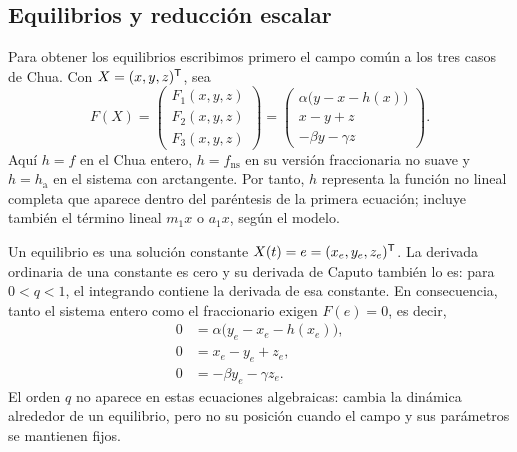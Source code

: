 \fi
\ifnum{}\relax
\subsection{Equilibrios y reducción escalar}
\label{app:equilibrios}

Para obtener los equilibrios escribimos primero el campo común a los tres
casos de Chua. Con \(X=(x,y,z)^{\mathsf T}\), sea
\[
F(X)=
\begin{pmatrix}
F_1(x,y,z)\\ F_2(x,y,z)\\ F_3(x,y,z)
\end{pmatrix}
=
\begin{pmatrix}
\alpha\bigl(y-x-h(x)\bigr)\\
x-y+z\\
-\beta y-\gamma z
\end{pmatrix}.
\]
Aquí \(h=f\) en el Chua entero, \(h=f_{\mathrm{ns}}\) en su versión
fraccionaria no suave y \(h=h_{\mathrm a}\) en el sistema con arctangente.
Por tanto, \(h\) representa la función no lineal completa que aparece dentro
del paréntesis de la primera ecuación; incluye también el término lineal
\(m_1x\) o \(a_1x\), según el modelo.

Un equilibrio es una solución constante \(X(t)=e=(x_e,y_e,z_e)^{\mathsf T}\).
La derivada ordinaria de una constante es cero y su derivada de Caputo
también lo es: para \(0<q<1\), el integrando contiene la derivada de esa
constante. En consecuencia, tanto el sistema entero como el fraccionario
exigen \(F(e)=0\), es decir,
\[
\begin{aligned}
0&=\alpha\bigl(y_e-x_e-h(x_e)\bigr),\\
0&=x_e-y_e+z_e,\\
0&=-\beta y_e-\gamma z_e.
\end{aligned}
\]
El orden \(q\) no aparece en estas ecuaciones algebraicas: cambia la dinámica
alrededor de un equilibrio, pero no su posición cuando el campo y sus
parámetros se mantienen fijos.


